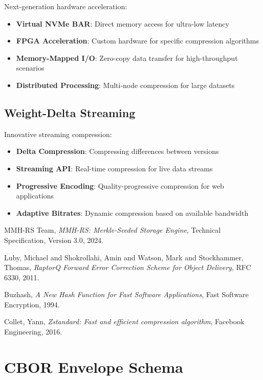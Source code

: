 \documentclass[11pt,a4paper]{article}
\begin{document}
	Next-generation hardware acceleration:
	\begin{itemize}
		\item \textbf{Virtual NVMe BAR}: Direct memory access for ultra-low latency
		\item \textbf{FPGA Acceleration}: Custom hardware for specific compression algorithms
		\item \textbf{Memory-Mapped I/O}: Zero-copy data transfer for high-throughput scenarios
		\item \textbf{Distributed Processing}: Multi-node compression for large datasets
	\end{itemize}
	
	\subsection{Weight-Delta Streaming}
	
	Innovative streaming compression:
	\begin{itemize}
		\item \textbf{Delta Compression}: Compressing differences between versions
		\item \textbf{Streaming API}: Real-time compression for live data streams
		\item \textbf{Progressive Encoding}: Quality-progressive compression for web applications
		\item \textbf{Adaptive Bitrates}: Dynamic compression based on available bandwidth
	\end{itemize}
	
	
	\begin{thebibliography}{9}
	MMH-RS Team,
	\textit{MMH-RS: Merkle-Seeded Storage Engine},
	Technical Specification, Version 3.0, 2024.
	
	Luby, Michael and Shokrollahi, Amin and Watson, Mark and Stockhammer, Thomas,
	\textit{RaptorQ Forward Error Correction Scheme for Object Delivery},
	RFC 6330, 2011.
	
	Buzhash,
	\textit{A New Hash Function for Fast Software Applications},
	Fast Software Encryption, 1994.
	
	Collet, Yann,
	\textit{Zstandard: Fast and efficient compression algorithm},
	Facebook Engineering, 2016.
	\end{thebibliography}
	
	\appendix
	
	\section{CBOR Envelope Schema}
	
\end{document}
